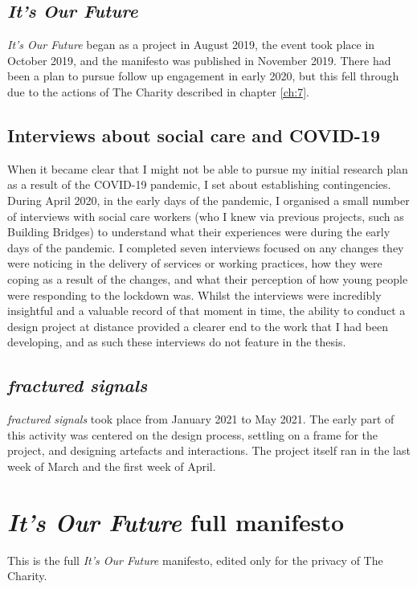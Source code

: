 \section{\textit{It's Our Future}}
\textit{It's Our Future} began as a project in August 2019, the event took place in October 2019, and the manifesto was published in November 2019. There had been a plan to pursue follow up engagement in early 2020, but this fell through due to the actions of The Charity described in chapter \ref{ch:7}.

\section{Interviews about social care and COVID-19}
When it became clear that I might not be able to pursue my initial research plan as a result of the COVID-19 pandemic, I set about establishing contingencies. During April 2020, in the early days of the pandemic, I organised a small number of interviews with social care workers (who I knew via previous projects, such as Building Bridges) to understand what their experiences were during the early days of the pandemic. I completed seven interviews focused on any changes they were noticing in the delivery of services or working practices, how they were coping as a result of the changes, and what their perception of how young people were responding to the lockdown was. Whilst the interviews were incredibly insightful and a valuable record of that moment in time, the ability to conduct a design project at distance provided a clearer end to the work that I had been developing, and as such these interviews do not feature in the thesis.

\section{\textit{fractured signals}}
\textit{fractured signals} took place from January 2021 to May 2021. The early part of this activity was centered on the design process, settling on a frame for the project, and designing artefacts and interactions. The project itself ran in the last week of March and the first week of April.

\chapter{\textit{It's Our Future} full manifesto}
\label{appendix:iof-manifesto}
This is the full \textit{It's Our Future} manifesto, edited only for the privacy of The Charity.



